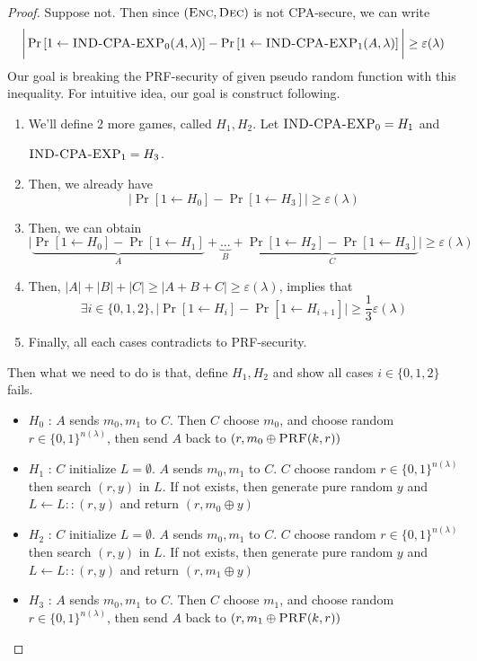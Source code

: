 \documentclass[12pt, a4paper, openany, twoside]{book}
\theoremstyle{definition}
\theoremstyle{remark}
\theoremstyle{plain}
\numberwithin{equation}{section}
\begin{document}
\begin{proof}
    
Suppose not. Then since $(\textsc{Enc}, \textsc{Dec})$ is not CPA-secure, we can write 
\[\bigg| \Pr\left[1 \gets \textsc{IND-CPA-EXP}_0(A, \lambda)\right] - \Pr\left[1 \gets \textsc{IND-CPA-EXP}_1(A, \lambda)\right] \bigg| \geq \varepsilon(\lambda)\]
Our goal is breaking the \textsc{PRF}-security of given pseudo random function with this inequality. 
For intuitive idea, our goal is construct following. 
\begin{enumerate}
    \item We'll define 2 more games, called $H_1, H_2$. Let $\textsc{IND-CPA-EXP}_0 = H_1$ and 
    
    $\textsc{IND-CPA-EXP}_1 = H_3$. 
    \item Then, we already have 
    \[\bigg| \Pr[1 \gets H_0] - \Pr[1 \gets H_3] \bigg| \geq \varepsilon(\lambda)\]
    \item Then, we can obtain 
    \[\bigg| \underbrace{\Pr[1 \gets H_0] - \Pr[1 \gets H_1]}_A + \underbrace{...}_B + \underbrace{\Pr[1 \gets H_2] - \Pr[1 \gets H_3]}_C \bigg| \geq \varepsilon(\lambda)\]
    \item Then, $|A| + |B| + |C| \geq |A+B+C| \geq \varepsilon(\lambda)$, implies that 
    \[\exists i \in \{0,1,2\}, \bigg| \Pr\left[1 \gets H_i\right] - \Pr\left[1 \gets H_{i+1}\right] \bigg| \geq \frac{1}{3}\varepsilon(\lambda) \]
    \item Finally, all each cases contradicts to \textsc{PRF}-security. 
\end{enumerate}

Then what we need to do is that, define $H_1, H_2$ and show all cases $i \in \{0, 1, 2\}$ fails. 

\begin{itemize}
    \item $H_0$ : $A$ sends $m_0, m_1$ to $C$. Then $C$ choose $m_0$, and choose random $r \in \{0, 1\}^{n(\lambda)}$, 
    then send $A$ back to $(r, m_0 \oplus \textsc{PRF}(k, r))$
    \item $H_1$ : $C$ initialize $L = \emptyset$. $A$ sends $m_0, m_1$ to $C$. 
    $C$ choose random $r \in \{0,1\}^{n(\lambda)}$ then search $(r, y)$ in $L$. If not exists, then 
    generate pure random $y$ and $L \gets L::(r, y)$ and return $(r, m_0 \oplus y)$
    \item $H_2$ : $C$ initialize $L = \emptyset$. $A$ sends $m_0, m_1$ to $C$. 
    $C$ choose random $r \in \{0,1\}^{n(\lambda)}$ then search $(r, y)$ in $L$. If not exists, then 
    generate pure random $y$ and $L \gets L::(r, y)$ and return $(r, m_1 \oplus y)$
    \item $H_3$ : $A$ sends $m_0, m_1$ to $C$. Then $C$ choose $m_1$, and choose random $r \in \{0, 1\}^{n(\lambda)}$, 
    then send $A$ back to $(r, m_1 \oplus \textsc{PRF}(k, r))$
\end{itemize}


\end{proof}
\end{document}
